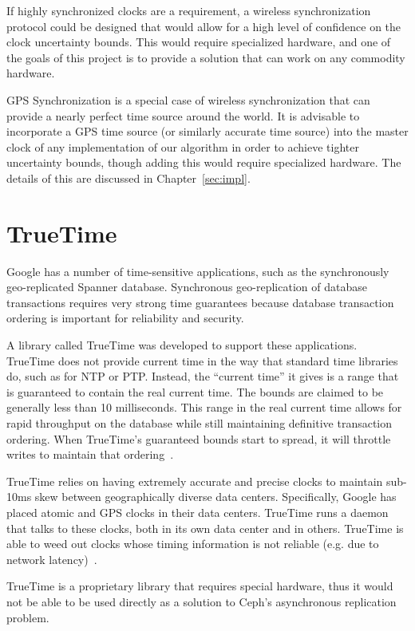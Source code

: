 If highly synchronized clocks are a requirement, a wireless
synchronization protocol could be designed that would allow for
a high level of confidence on the clock uncertainty bounds. 
This would require specialized hardware, and one of the goals of 
this project is to provide a solution that can work on any commodity hardware. 

GPS Synchronization is a special case of wireless synchronization that
can provide a nearly perfect time source around the world. It is
advisable to incorporate a GPS time source (or similarly accurate time
source) into the master clock of any implementation of our
algorithm in order to achieve tighter uncertainty bounds, 
though adding this would require specialized hardware.
The details of this are discussed in Chapter~\ref{sec:impl}.

\section{TrueTime}

Google has a number of time-sensitive applications, such as
the synchronously geo-replicated Spanner database. Synchronous
geo-replication of database transactions requires very strong time
guarantees because database transaction ordering is important for 
reliability and security. 

A library called TrueTime was developed to support these applications.
TrueTime does not provide current time in the way that standard time
libraries do, such as for NTP or PTP. Instead, the ``current time'' it gives is a range that is guaranteed to contain
the real current time. The bounds are claimed to be generally less than 10
milliseconds. This range in the real current time allows for rapid 
throughput on the database while still maintaining definitive transaction ordering. When TrueTime's guaranteed bounds start to spread, 
it will throttle writes to maintain that ordering~\citep{Corbett2012}.

TrueTime relies on having extremely accurate and precise clocks 
to maintain sub-10ms skew between geographically diverse data centers. Specifically, Google has placed atomic and GPS clocks in their data 
centers. TrueTime runs a daemon that talks to these clocks, both in its own data center and in others. TrueTime is able to weed out clocks whose 
timing information is not reliable 
(e.g. due to network latency)~\citep{Corbett2012}.

TrueTime is a proprietary
library that requires special hardware, thus it would not be able to
be used directly as a solution to Ceph's asynchronous replication
problem. 

